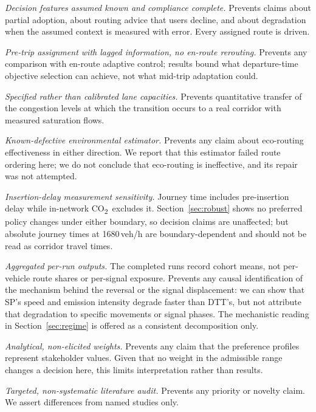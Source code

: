 \documentclass[10pt,a4paper]{article}
\newcommand{\CO}{CO\textsubscript{2}}
\begin{document}
\emph{Decision features assumed known and compliance complete.} Prevents claims about partial adoption, about routing advice that users decline, and about degradation when the assumed context is measured with error. Every assigned route is driven.

\emph{Pre-trip assignment with lagged information, no en-route rerouting.} Prevents any comparison with en-route adaptive control; results bound what departure-time objective selection can achieve, not what mid-trip adaptation could.

\emph{Specified rather than calibrated lane capacities.} Prevents quantitative transfer of the congestion levels at which the transition occurs to a real corridor with measured saturation flows.

\emph{Known-defective environmental estimator.} Prevents any claim about eco-routing effectiveness in either direction. We report that this estimator failed route ordering here; we do not conclude that eco-routing is ineffective, and its repair was not attempted.

\emph{Insertion-delay measurement sensitivity.} Journey time includes pre-insertion delay while in-network \CO\ excludes it. Section~\ref{sec:robust} shows no preferred policy changes under either boundary, so decision claims are unaffected; but absolute journey times at 1680\,veh/h are boundary-dependent and should not be read as corridor travel times.

\emph{Aggregated per-run outputs.} The completed runs record cohort means, not per-vehicle route shares or per-signal exposure. Prevents any causal identification of the mechanism behind the reversal or the signal displacement: we can show that SP's speed and emission intensity degrade faster than DTT's, but not attribute that degradation to specific movements or signal phases. The mechanistic reading in Section~\ref{sec:regime} is offered as a consistent decomposition only.

\emph{Analytical, non-elicited weights.} Prevents any claim that the preference profiles represent stakeholder values. Given that no weight in the admissible range changes a decision here, this limits interpretation rather than results.

\emph{Targeted, non-systematic literature audit.} Prevents any priority or novelty claim. We assert differences from named studies only.
\end{document}
